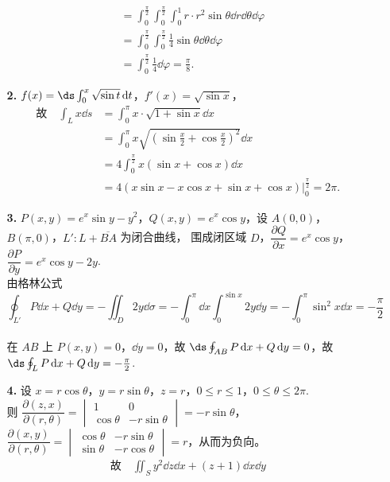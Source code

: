 \documentclass{ctexart}
\begin{document}
\begin{enumerate}
\begin{enumerate}
\begin{align*}
        & =\int_{0}^{\frac{\pi}{2}}\int_{0}^{\frac{\pi}{2}}\int_0^1r\cdot r^2\sin\theta\dd{r}\dd{\theta}\dd{\varphi} \\
        & =\int_0^{\frac{\pi}{2}}\int_0^{\frac{\pi}{2}}\frac{1}{4}\sin\theta\dd{\theta}\dd{\varphi} \\
        & =\int_0^{\frac{\pi}{2}}\frac{1}{4}\dd{\varphi}=\frac{\pi}{8}.
        \end{align*}
        \item[\textbf{2.}] $f(x)=\ds\int_0^x\sqrt{\sin t}\dd{t}$，$f'(x)=\sqrt{\sin x}$，
        \begin{align*}
        \text{故} \quad\int_L x\dd{s}
        & =\int_0^{\pi}x\cdot\sqrt{1+\sin x}\dd{x} \\
        & =\int_0^{\pi}x\sqrt{(\sin\frac{x}{2}+\cos\frac{x}{2})^2}\dd{x} \\
        & =4\int_0^{\frac{\pi}{2}}x(\sin x+\cos x)\dd{x} \\
        & =4(x\sin x-x\cos x+\sin x+\cos x)\vert_0^{\frac{\pi}{2}}=2\pi.
        \end{align*}
        \item[\textbf{3.}] $P(x,y)=e^x\sin y-y^2$，$Q(x,y)=e^x\cos y$，设 $A(0,0)$，$B(\pi,0)$，$L':L+\overline{BA}$ 为闭合曲线，
        围成闭区域 $D$，$\dfrac{\partial Q}{\partial x}=e^x\cos y$，$\dfrac{\partial P}{\partial y}=e^x\cos y-2y$. \\
        由格林公式 $$\oint_{L'}P\dd{x}+Q\dd{y}=-\iint_D 2y\dd{\sigma}=-\int_0^\pi\dd{x}\int_0^{\sin x}2y\dd{y}=-\int_0^\pi \sin^2x\dd{x}=-\frac{\pi}{2}$$ \\
        在 $AB$ 上 $P(x,y)=0$，$\dd{y}=0$，故 $\ds\oint_{AB}P\dd{x}+Q\dd{y}=0$，故 $\ds\oint_{L}P\dd{x}+Q\dd{y}=-\frac{\pi}{2}$.
        \item[\textbf{4.}] 设 $x=r\cos\theta$，$y=r\sin\theta$，$z=r$，$0\le r\le 1$，$0\le\theta\le 2\pi$. \\
        则 $\dfrac{\partial(z,x)}{\partial(r,\theta)}=\begin{vmatrix}
        1 & 0 \\
        \cos\theta & -r\sin\theta
        \end{vmatrix}=-r\sin\theta$，$\dfrac{\partial(x,y)}{\partial(r,\theta)}=\begin{vmatrix}
        \cos\theta & -r\sin\theta \\
        \sin\theta & -r\cos\theta
        \end{vmatrix}=r$，从而为负向。
        \begin{align*}
        \text{故} \quad\iint_Sy^2\dd{z}\dd{x}+(z+1)\dd{x}\dd{y}

\end{align*}
\end{enumerate}
\end{enumerate}
\end{document}
